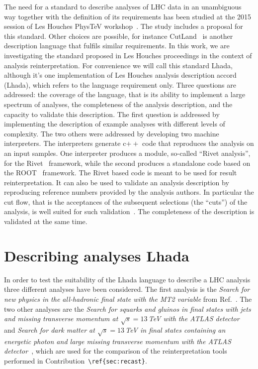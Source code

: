 \documentclass[11pt]{cernrep}
\begin{document}
The need for a standard to describe analyses of LHC data in an unambiguous way together with the definition of its requirements has been studied at the 2015 session of Les Houches PhysTeV workshop~\cite{Brooijmans:2016vro}. The study includes a proposal for this standard. Other choices are possible, for instance {\sc CutLand}~\cite{Sekmen:2018ehb} is another description language that fulfils similar requirements. In this work, we are investigating the standard proposed in Les Houches proceedings in the context of analysis reinterpretation. For convenience we will call this standard {\sc Lhada}, although it's one implementation of Les Houches analysis description accord (Lhada), which refers to the language requirement only. Three questions are addressed: the coverage of the language, that is its ability to implement a large spectrum of analyses, the completeness of the analysis description, and the capacity to validate this description. The first question is addressed by implementing the description of example analyses with different levels of complexity. The two others were addressed by developing two machine interpreters. The interpreters generate c$++$ code that reproduces the analysis on an input samples. One interpreter produces a module, so-called ``Rivet analysis'', for the Rivet~\cite{Buckley:2010ar} framework, while the second produces a standalone code based on the ROOT~\cite{Brun:1997pa} framework. The Rivet based code is meant to be used for result reinterpretation. It can also be used to validate an analysis description by reproducing reference numbers provided by the analysis authors. In particular the cut flow, that is the acceptances of the subsequent selections (the ``cuts'') of the analysis, is well suited for such validation~\cite{Kraml:2012sg}. The completeness of the description is validated at the same time.

\section{Describing analyses  {\sc Lhada}}

In order to test the suitability of the {\sc Lhada} language to describe a LHC analysis three different analyses have been considered. The first analysis is the {\em Search for new physics in the all-hadronic final state with the MT2 variable} from Ref.~\cite{CMS:2016xva}. The two other analyses are the {\em Search for squarks and gluinos in final states with jets and missing transverse momentum at $\sqrt{s} = 13\,$TeV  with the ATLAS detector}~\cite{Aaboud:2016zdn} and {\em Search for dark matter at $\sqrt{s}=13\,$TeV in final states containing an energetic photon and large missing transverse momentum with the ATLAS detector}~\cite{Aaboud:2017dor}, which are used for the comparison of the reinterpretation tools performed in Contribution~\verb|\ref{sec:recast}|.
\end{document}
